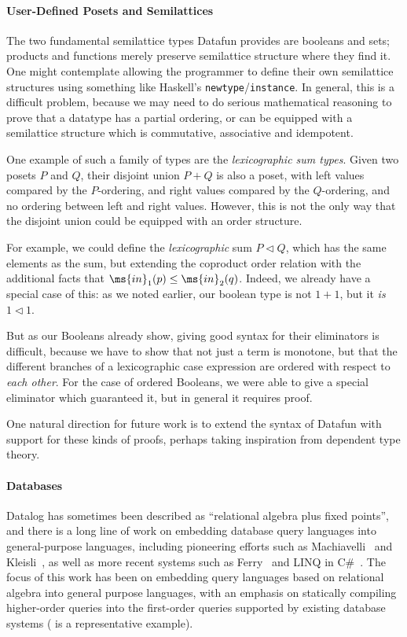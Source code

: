 \paragraph{User-Defined Posets and Semilattices}
The two fundamental semilattice types Datafun provides are booleans and sets;
products and functions merely preserve semilattice structure where they find
it. One might contemplate allowing the programmer to define their own
semilattice structures using something like Haskell's
\texttt{newtype}/\texttt{instance}. In general, this is a difficult
problem, because we may need to do serious mathematical
reasoning to prove that a datatype has a partial ordering, or can be
equipped with a semilattice structure which is commutative, associative
and idempotent.

One example of such a family of types are the \emph{lexicographic sum
  types}. Given two posets $P$ and $Q$, their disjoint union $P + Q$
is also a poset, with left values compared by the $P$-ordering, and
right values compared by the $Q$-ordering, and no ordering between
left and right values. However, this is not the only way that the
disjoint union could be equipped with an order structure.

For example, we could define the \emph{lexicographic} sum $P \lhd Q$,
which has the same elements as the sum, but extending the coproduct order
relation with the additional
facts that $\ms{in}_1(p) \leq \ms{in}_2(q)$. Indeed, we already have a
special case of this: as we noted earlier, our boolean type is not $1
+ 1$, but it \emph{is} $1 \lhd 1$.

But as our Booleans already show, giving good syntax for their
eliminators is difficult, because we have to show that not just a term
is monotone, but that the different branches of a lexicographic case
expression are ordered with respect to \emph{each other}. For the case
of ordered Booleans, we were able to give a special eliminator which
guaranteed it, but in general it requires proof.

One natural direction for future work is to extend the syntax of
Datafun with support for these kinds of proofs, perhaps taking
inspiration from dependent type theory.

\paragraph{Databases} Datalog has sometimes been described
as ``relational algebra plus fixed points'', and there is a long line
of work on embedding database query languages into general-purpose
languages, including pioneering efforts such as
Machiavelli~\cite{machiavelli} and Kleisli~\cite{kleisli}, as well as
more recent systems such as Ferry~\cite{ferry} and LINQ in C\#~\cite{linq-wadler}.
%
The focus of this work has been on embedding query languages based
on relational algebra into general purpose languages, with an emphasis
on statically compiling higher-order queries into the first-order
queries supported by existing database systems (\citet{query-shredding} is a
representative example).

